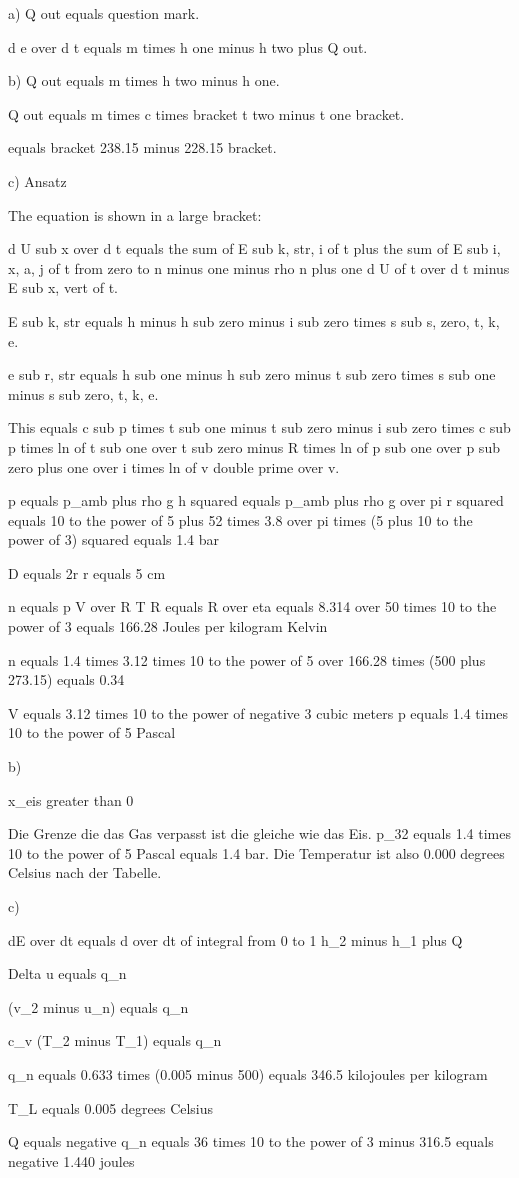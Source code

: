 a) Q out equals question mark.

d e over d t equals m times h one minus h two plus Q out.

b) Q out equals m times h two minus h one.

Q out equals m times c times bracket t two minus t one bracket.

equals bracket 238.15 minus 228.15 bracket.

c) Ansatz

The equation is shown in a large bracket:

d U sub x over d t equals the sum of E sub k, str, i of t plus the sum of E sub i, x, a, j of t from zero to n minus one minus rho n plus one d U of t over d t minus E sub x, vert of t.

E sub k, str equals h minus h sub zero minus i sub zero times s sub s, zero, t, k, e.

e sub r, str equals h sub one minus h sub zero minus t sub zero times s sub one minus s sub zero, t, k, e.

This equals c sub p times t sub one minus t sub zero minus i sub zero times c sub p times ln of t sub one over t sub zero minus R times ln of p sub one over p sub zero plus one over i times ln of v double prime over v.

p equals p_amb plus rho g h squared  
equals p_amb plus rho g over pi r squared  
equals 10 to the power of 5 plus 52 times 3.8 over pi times (5 plus 10 to the power of 3) squared  
equals 1.4 bar  

D equals 2r  
r equals 5 cm  

n equals p V over R T  
R equals R over eta equals 8.314 over 50 times 10 to the power of 3 equals 166.28 Joules per kilogram Kelvin  

n equals 1.4 times 3.12 times 10 to the power of 5 over 166.28 times (500 plus 273.15)  
equals 0.34  

V equals 3.12 times 10 to the power of negative 3 cubic meters  
p equals 1.4 times 10 to the power of 5 Pascal  

b)  

x_eis greater than 0  

Die Grenze die das Gas verpasst ist die gleiche wie das Eis. p_32 equals 1.4 times 10 to the power of 5 Pascal equals 1.4 bar. Die Temperatur ist also 0.000 degrees Celsius nach der Tabelle.  

c)  

dE over dt equals d over dt of integral from 0 to 1 h_2 minus h_1 plus Q  

Delta u equals q_n  

(v_2 minus u_n) equals q_n  

c_v (T_2 minus T_1) equals q_n  

q_n equals 0.633 times (0.005 minus 500)  
equals 346.5 kilojoules per kilogram  

T_L equals 0.005 degrees Celsius  

Q equals negative q_n  
equals 36 times 10 to the power of 3 minus 316.5  
equals negative 1.440 joules